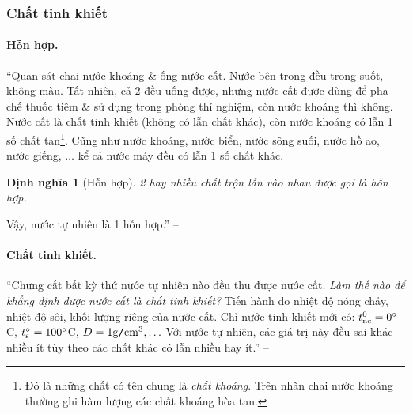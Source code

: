 \documentclass{article}
\numberwithin{equation}{section}
\newtheorem{dinhnghia}{Định nghĩa}[section]
\begin{document}
\subsubsection{Chất tinh khiết}

\paragraph{Hỗn hợp.} ``Quan sát chai nước khoáng \& ống nước cất. Nước bên trong đều trong suốt, không màu. Tất nhiên, cả 2 đều uống được, nhưng nước cất được dùng để pha chế thuốc tiêm \& sử dụng trong phòng thí nghiệm, còn nước khoáng thì không. Nước cất là chất tinh khiết (không có lẫn chất khác), còn nước khoáng có lẫn 1 số chất tan\footnote{Đó là những chất có tên chung là \textit{chất khoáng}. Trên nhãn chai nước khoáng thường ghi hàm lượng các chất khoáng hòa tan.}. Cũng như nước khoáng, nước biển, nước sông suối, nước hồ ao, nước giếng, $\ldots$ kể cả nước máy đều có lẫn 1 số chất khác.

\begin{dinhnghia}[Hỗn hợp]
	2 hay nhiều chất trộn lẫn vào nhau được gọi là \textit{hỗn hợp}.
\end{dinhnghia}
Vậy, nước tự nhiên là 1 hỗn hợp.'' -- \cite[p. 9]{SGK_Hoa_Hoc_8}

\paragraph{Chất tinh khiết.} ``Chưng cất bất kỳ thứ nước tự nhiên nào đều thu được nước cất. \textit{Làm thế nào để khẳng định được nước cất là chất tinh khiết?} Tiến hành đo nhiệt độ nóng chảy, nhiệt độ sôi, khối lượng riêng của nước cất. Chỉ nước tinh khiết mới có: $t_{\rm nc}^0 = 0^\circ$C, $t_{\rm s}^\circ = 100^\circ$C, $D = 1{\rm g\texttt{/}cm^3},\ldots$ Với nước tự nhiên, các giá trị này đều sai khác nhiều ít tùy theo các chất khác có lẫn nhiều hay ít.'' -- \cite[p. 10]{SGK_Hoa_Hoc_8}
\end{document}
